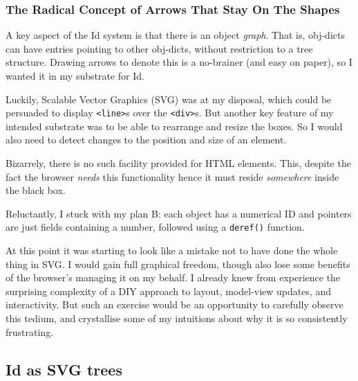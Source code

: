 \hypertarget{the-radical-concept-of-arrows-that-stay-on-the-shapes}{%
\subsubsection{The Radical Concept of Arrows That Stay On The
Shapes}\label{the-radical-concept-of-arrows-that-stay-on-the-shapes}}

A key aspect of the Id{} system is that there is an object \emph{graph}.
That is, obj-dicts can have entries pointing to other obj-dicts, without
restriction to a tree structure. Drawing arrows to denote this is a
no-brainer (and easy on paper), so I wanted it in my substrate for Id{}.

Luckily, Scalable Vector Graphics (SVG) was at my disposal, which could
be persuaded to display \texttt{\textless{}line\textgreater{}}s over the
\texttt{\textless{}div\textgreater{}}s. But another key feature of my
intended substrate was to be able to rearrange and resize the boxes. So
I would also need to detect changes to the position and size of an
element.

Bizarrely, there is no such facility provided for HTML elements. This,
despite the fact the browser \emph{needs} this functionality hence it
must reside \emph{somewhere} inside the black box.

Reluctantly, I stuck with my plan B: each object has a numerical ID and
pointers are just fields containing a number, followed using a
\texttt{deref()} function.

At this point it was starting to look like a mistake not to have done
the whole thing in SVG. I would gain full graphical freedom, though also
lose some benefits of the browser's managing it on my behalf. I already
knew from experience the surprising complexity of a DIY approach to
layout, model-view updates, and interactivity. But such an exercise
would be an opportunity to carefully observe this tedium, and
crystallise some of my intuitions about why it is so consistently
frustrating.

\hypertarget{id-as-svg-trees}{%
\subsection{Id as SVG trees}\label{id-as-svg-trees}}

